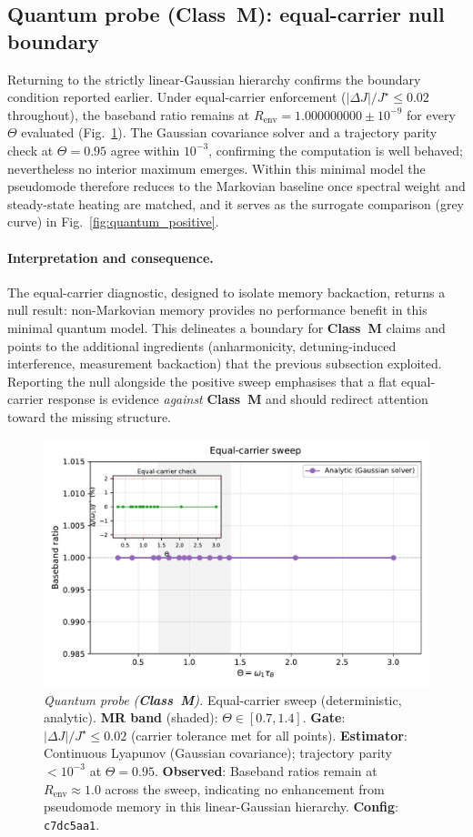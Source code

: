\documentclass[11pt,letterpaper]{article}
\newcommand{\confighash}{c7dc5aa1}
\DeclareRobustCommand{\classM}{\textbf{Class~M}\xspace}
\begin{document}
\subsection{Quantum probe (\classM): equal-carrier null boundary}
\label{sec:results_quantum}
Returning to the strictly linear-Gaussian hierarchy confirms the boundary condition reported earlier. Under equal-carrier enforcement ($|\Delta J|/J^\star \le 0.02$ throughout), the baseband ratio remains at $R_{\mathrm{env}} = 1.000000000\pm 10^{-9}$ for every $\Theta$ evaluated (Fig.~\ref{fig:quantum_null}). The Gaussian covariance solver and a trajectory parity check at $\Theta=0.95$ agree within $10^{-3}$, confirming the computation is well behaved; nevertheless no interior maximum emerges. Within this minimal model the pseudomode therefore reduces to the Markovian baseline once spectral weight and steady-state heating are matched, and it serves as the surrogate comparison (grey curve) in Fig.~\ref{fig:quantum_positive}.

\paragraph*{Interpretation and consequence.} The equal-carrier diagnostic, designed to isolate memory backaction, returns a null result: non-Markovian memory provides no performance benefit in this minimal quantum model. This delineates a boundary for \classM{} claims and points to the additional ingredients (anharmonicity, detuning-induced interference, measurement backaction) that the previous subsection exploited. Reporting the null alongside the positive sweep emphasises that a flat equal-carrier response is evidence \emph{against} \classM{} and should redirect attention toward the missing structure.

\begin{figure}[t]
\centering
\includegraphics[width=0.8\linewidth]{figB_equal_carrier.pdf}
\caption{\label{fig:quantum_null}\emph{Quantum probe (\classM).} Equal-carrier sweep (deterministic, analytic). \textbf{MR band} (shaded): $\Theta\in[0.7,1.4]$. \textbf{Gate}: $|\Delta J|/J^\star\le 0.02$ (carrier tolerance met for all points). \textbf{Estimator}: Continuous Lyapunov (Gaussian covariance); trajectory parity $<10^{-3}$ at $\Theta=0.95$. \textbf{Observed}: Baseband ratios remain at $R_{\mathrm{env}}\approx 1.0$ across the sweep, indicating no enhancement from pseudomode memory in this linear-Gaussian hierarchy. \textbf{Config}: \texttt{\confighash}.}
\end{figure}
\end{document}
